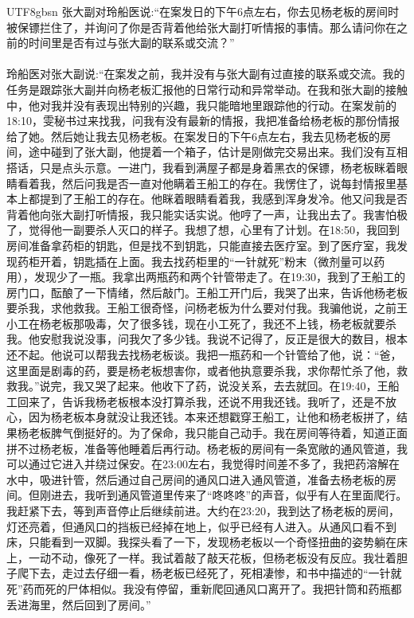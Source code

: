 \documentclass[11pt]{article}
\begin{document}
{\begin{CJK}{UTF8}{gbsn}
张大副对玲船医说:``在案发日的下午6点左右，你去见杨老板的房间时被保镖拦住了，并询问了你是否背着他给张大副打听情报的事情。那么请问你在之前的时间里是否有过与张大副的联系或交流？''\\ \\
玲船医对张大副说:``在案发之前，我并没有与张大副有过直接的联系或交流。我的任务是跟踪张大副并向杨老板汇报他的日常行动和异常举动。在我和张大副的接触中，他对我并没有表现出特别的兴趣，我只能暗地里跟踪他的行动。在案发前的18:10，雯秘书过来找我，问我有没有最新的情报，我把准备给杨老板的那份情报给了她。然后她让我去见杨老板。在案发日的下午6点左右，我去见杨老板的房间，途中碰到了张大副，他提着一个箱子，估计是刚做完交易出来。我们没有互相搭话，只是点头示意。一进门，我看到满屋子都是身着黑衣的保镖，杨老板眯着眼睛看着我，然后问我是否一直对他瞒着王船工的存在。我愣住了，说每封情报里基本上都提到了王船工的存在。他眯着眼睛看着我，我感到浑身发冷。他又问我是否背着他向张大副打听情报，我只能实话实说。他哼了一声，让我出去了。我害怕极了，觉得他一副要杀人灭口的样子。我想了想，心里有了计划。在18:50，我回到房间准备拿药柜的钥匙，但是找不到钥匙，只能直接去医疗室。到了医疗室，我发现药柜开着，钥匙插在上面。我去找药柜里的“一针就死”粉末（微剂量可以药用），发现少了一瓶。我拿出两瓶药和两个针管带走了。在19:30，我到了王船工的房门口，酝酿了一下情绪，然后敲门。王船工开门后，我哭了出来，告诉他杨老板要杀我，求他救我。王船工很奇怪，问杨老板为什么要对付我。我骗他说，之前王小工在杨老板那吸毒，欠了很多钱，现在小工死了，我还不上钱，杨老板就要杀我。他安慰我说没事，问我欠了多少钱。我说不记得了，反正是很大的数目，根本还不起。他说可以帮我去找杨老板谈。我把一瓶药和一个针管给了他，说：“爸，这里面是剧毒的药，要是杨老板想害你，或者他执意要杀我，求你帮忙杀了他，救救我。”说完，我又哭了起来。他收下了药，说没关系，去去就回。在19:40，王船工回来了，告诉我杨老板根本没打算杀我，还说不用我还钱。我听了，还是不放心，因为杨老板本身就没让我还钱。本来还想戳穿王船工，让他和杨老板拼了，结果杨老板脾气倒挺好的。为了保命，我只能自己动手。我在房间等待着，知道正面拼不过杨老板，准备等他睡着后再行动。杨老板的房间有一条宽敞的通风管道，我可以通过它进入并绕过保安。在23:00左右，我觉得时间差不多了，我把药溶解在水中，吸进针管，然后通过自己房间的通风口进入通风管道，准备去杨老板的房间。但刚进去，我听到通风管道里传来了“咚咚咚”的声音，似乎有人在里面爬行。我赶紧下去，等到声音停止后继续前进。大约在23:20，我到达了杨老板的房间，灯还亮着，但通风口的挡板已经掉在地上，似乎已经有人进入。从通风口看不到床，只能看到一双脚。我探头看了一下，发现杨老板以一个奇怪扭曲的姿势躺在床上，一动不动，像死了一样。我试着敲了敲天花板，但杨老板没有反应。我壮着胆子爬下去，走过去仔细一看，杨老板已经死了，死相凄惨，和书中描述的“一针就死”药而死的尸体相似。我没有停留，重新爬回通风口离开了。我把针筒和药瓶都丢进海里，然后回到了房间。''\\ \\

\end{CJK}}
\end{document}
